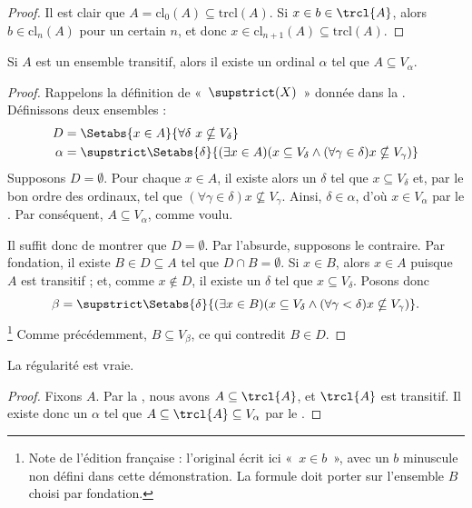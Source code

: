 \documentclass[../../../include/open-logic-section]{subfiles}
\begin{document}
\begin{proof}
Il est clair que $A = \text{cl}_0(A) \subseteq \text{trcl}(A)$.
Si $x \in b \in \trcl{A}$, alors $b \in \text{cl}_n(A)$ pour un certain
$n$, et donc
$x \in \text{cl}_{n+1}(A) \subseteq \text{trcl}(A)$.
\end{proof}

\begin{lem}
Si $A$ est un ensemble transitif, alors il existe un ordinal
$\alpha$ tel que $A \subseteq V_\alpha$.
\end{lem}

\begin{proof}
Rappelons la définition de «~$\supstrict(X)$~» donnée dans la
. Définissons deux ensembles :
\begin{align*}
	D  &= \Setabs{x \in A}{\forall \delta\ x \nsubseteq V_\delta}\\
	\alpha &= \supstrict\Setabs{\delta}{(\exists x \in A)
	(x \subseteq V_\delta \land (\forall \gamma \in \delta)x \nsubseteq V_\gamma)}
\end{align*}
Supposons $D = \emptyset$. Pour chaque $x \in A$, il existe alors un
$\delta$ tel que $x \subseteq V_\delta$ et, par le bon ordre des
ordinaux, tel que
$(\forall \gamma \in \delta)x \nsubseteq V_\gamma$. Ainsi,
$\delta \in \alpha$, d'où $x \in V_\alpha$ par le
. Par conséquent,
$A \subseteq V_{\alpha}$, comme voulu.

Il suffit donc de montrer que $D = \emptyset$. Par l'absurde,
supposons le contraire. Par fondation, il existe
$B \in D \subseteq A$ tel que $D \cap B = \emptyset$. Si $x \in B$,
alors $x \in A$ puisque $A$ est transitif ; et, comme $x \notin D$,
il existe un $\delta$ tel que $x \subseteq V_\delta$. Posons donc
\[
	\beta = \supstrict\Setabs{\delta}{(\exists x \in B)(x \subseteq V_\delta \land (\forall \gamma < \delta)x \nsubseteq V_\gamma)}.
\]
\footnote{Note de l'édition française : l'original écrit ici
«~$x \in b$~», avec un $b$ minuscule non défini dans cette
démonstration. La formule doit porter sur l'ensemble $B$ choisi par
fondation.}
Comme précédemment, $B \subseteq V_\beta$, ce qui contredit
$B \in D$.
\end{proof}

\begin{thm}
La régularité est vraie.
\end{thm}

\begin{proof}
Fixons $A$. Par la , nous avons
$A \subseteq \trcl{A}$, et $\trcl{A}$ est transitif. Il existe donc
un $\alpha$ tel que
$A \subseteq \trcl{A} \subseteq V_\alpha$ par le
.
\end{proof}
\end{document}
